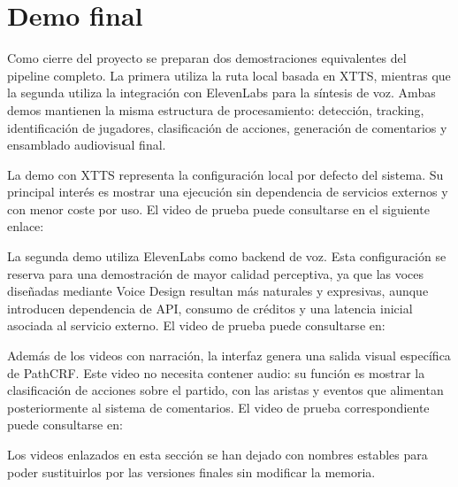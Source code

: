 \section{Demo final}
\label{sec:demo-final}

Como cierre del proyecto se preparan dos demostraciones equivalentes del pipeline completo. La primera utiliza la ruta local basada en XTTS, mientras que la segunda utiliza la integración con ElevenLabs para la síntesis de voz. Ambas demos mantienen la misma estructura de procesamiento: detección, tracking, identificación de jugadores, clasificación de acciones, generación de comentarios y ensamblado audiovisual final.

La demo con XTTS representa la configuración local por defecto del sistema. Su principal interés es mostrar una ejecución sin dependencia de servicios externos y con menor coste por uso. El video de prueba puede consultarse en el siguiente enlace:

\begin{center}
\end{center}

La segunda demo utiliza ElevenLabs como backend de voz. Esta configuración se reserva para una demostración de mayor calidad perceptiva, ya que las voces diseñadas mediante Voice Design resultan más naturales y expresivas, aunque introducen dependencia de API, consumo de créditos y una latencia inicial asociada al servicio externo. El video de prueba puede consultarse en:

\begin{center}
\end{center}

Además de los videos con narración, la interfaz genera una salida visual específica de PathCRF. Este video no necesita contener audio: su función es mostrar la clasificación de acciones sobre el partido, con las aristas y eventos que alimentan posteriormente al sistema de comentarios. El video de prueba correspondiente puede consultarse en:

\begin{center}
\end{center}

Los videos enlazados en esta sección se han dejado con nombres estables para poder sustituirlos por las versiones finales sin modificar la memoria.

